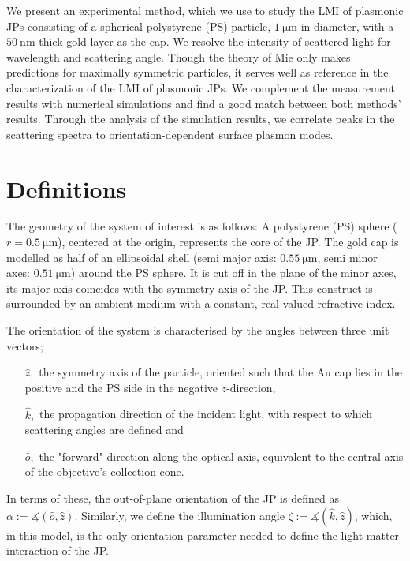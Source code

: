 \documentclass[10pt]{article}
\begin{document}
\begin{multicols}{2}
We present an experimental method, which we use to study the LMI of plasmonic JPs consisting of a spherical polystyrene (PS) particle, $\SI{1}{\micro\meter}$ in diameter, with a $\SI{50}{\nano\meter}$ thick gold layer as the cap. 
We resolve the intensity of scattered light for wavelength and scattering angle. 
Though the theory of Mie \cite{Mie1908} only makes predictions for maximally symmetric particles, it serves well as reference in the characterization of the LMI of plasmonic JPs. 
We complement the measurement results with numerical simulations and find a good match between both methods' results. 
Through the analysis of the simulation results, we correlate peaks in the scattering spectra to orientation-dependent surface plasmon modes. 




\section*{Definitions}

The geometry of the system of interest is as follows: 
A polystyrene (PS) sphere ($r=\SI{0.5}{\micro\meter}$), centered at the origin, represents the core of the JP. 
The gold cap is modelled as half of an ellipsoidal shell (semi major axis: $\SI{0.55}{\micro\meter}$, semi minor axes: $\SI{0.51}{\micro\meter}$) around the PS sphere. 
It is cut off in the plane of the minor axes, its major axis coincides with the symmetry axis of the JP. 
This construct is surrounded by an ambient medium with a constant, real-valued refractive index.  

The orientation of the system is characterised by the angles between three unit vectors;
\begin{itemize}
    \item[$\hat{z},$] the symmetry axis of the particle, oriented such that the Au cap lies in the positive and the PS side in the negative $z$-direction, 
    \item[$\hat{k},$] the propagation direction of the incident light, with respect to which scattering angles are defined and
    \item[$\hat{o},$] the "forward" direction along the optical axis, equivalent to the central axis of the objective's collection cone. 
\end{itemize}
In terms of these, the out-of-plane orientation of the JP is defined as
$\alpha := \measuredangle( \hat{o}, \hat{z} )$.
Similarly, we define the illumination angle 
$\zeta := \measuredangle( \hat{k}, \hat{z} )$, 
which, in this model, is the only orientation parameter needed to define the light-matter interaction of the JP. 


\end{multicols}
\end{document}
